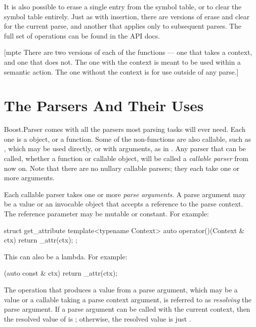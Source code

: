 \documentclass{MyBook}
\begin{document}
It is also possible to erase a single entry from the symbol table, or to clear the symbol table entirely. Just as with insertion, there are versions of erase and clear for the current parse, and another that applies only to subsequent parses. The full set of operations can be found in the  API docs.

{[}mpte There are two versions of each of the   functions --- one that takes a context, and one that does not. The one with the context is meant to be used within a semantic action. The one without the context is for use outside of any parse.{]}

\section{The Parsers And Their Uses}

Boost.Parser comes with all the parsers most parsing tasks will ever need. Each one is a  object, or a  function. Some of the non-functions are also callable, such as , which may be used directly, or with arguments, as in . Any parser that can be called, whether a function or callable object, will be called a \emph{callable parser} from now on. Note that there are no nullary callable parsers; they each take one or more arguments.

Each callable parser takes one or more \emph{parse arguments}. A parse argument may be a value or an invocable object that accepts a reference to the parse context. The reference parameter may be mutable or constant. For example:

\begin{code}
struct get_attribute
{
    template<typename Context>
    auto operator()(Context & ctx)
    {
        return _attr(ctx);
    }
};
\end{code}

This can also be a lambda. For example:

\begin{code}
[](auto const & ctx) { return _attr(ctx); }
\end{code}

The operation that produces a value from a parse argument, which may be a value or a callable taking a parse context argument, is referred to as \emph{resolving} the parse argument. If a parse argument  can be called with the current context, then the resolved value of  is ; otherwise, the resolved value is just .
\end{document}
